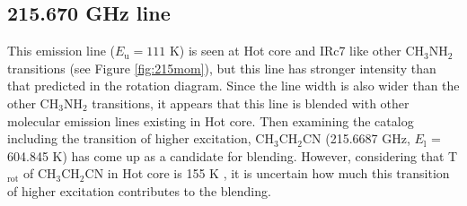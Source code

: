 \subsection*{215.670 GHz line}
This emission line ($E_{\mathrm{u}}=111$ K) is seen at Hot core and IRc7 like other CH$_{3}$NH$_{2}$ transitions 
(see Figure \ref{fig:215mom}), but this line has stronger intensity than that predicted in the rotation diagram.
Since the line width is also wider than the other CH$_{3}$NH$_{2}$ transitions, 
it appears that this line is blended with other molecular emission lines existing in Hot core.
Then examining the catalog including the transition of higher excitation, CH$_3$CH$_2$CN (215.6687 GHz, $E_{\mathrm{l}}$ = 604.845 K)
has come up as a candidate for blending.
However, considering that T$_{\mathrm{rot}}$ of CH$_3$CH$_2$CN in Hot core is 155 K \citep{Feng+2015}, 
it is uncertain how much this transition of higher excitation contributes to the blending.

